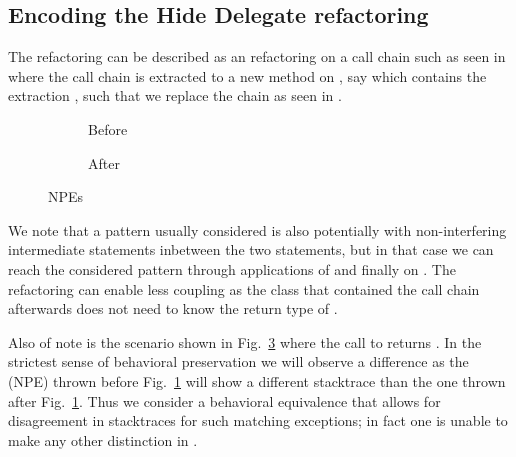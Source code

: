 \subsection{Encoding the Hide Delegate refactoring}\label{sec:hideDelegate}

The  refactoring can be described as an  refactoring on a call chain such as seen in 
where the call chain is extracted to a new method on , say  which contains the extraction , such that we replace the chain as seen in .

\begin{figure}[tbp]
  \centering
  \begin{subfigure}{.3\linewidth}
    
    \caption{Before}
    \label{fig:hd-npe-before}
  \end{subfigure}
  \begin{subfigure}{.3\linewidth}
    
    \caption{After}
    \label{fig:hd-npe-after}    
  \end{subfigure}
  \caption{NPEs}
  \label{fig:NPEs}
\end{figure}

We note that a pattern usually considered is also  potentially with non-interfering intermediate statements inbetween the two statements,
but in that case we can reach the considered pattern through applications of  and finally  on .
The refactoring can enable less coupling as the class that contained the call chain afterwards does not need to know the return type of .

Also of note is the scenario shown in Fig.~\ref{fig:NPEs} where the call to  returns . In the strictest sense of behavioral preservation
we will observe a difference as the  (NPE) thrown before Fig.~\ref{fig:hd-npe-before} will show a different stacktrace than the one thrown after Fig.~\ref{fig:hd-npe-before}.
Thus we consider a behavioral equivalence that allows for disagreement in stacktraces for such matching exceptions; in fact one is unable to make any other distinction in \Refinity{}.



